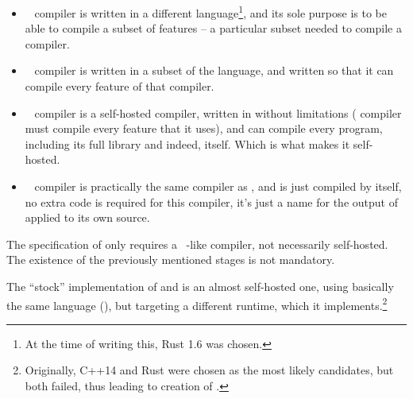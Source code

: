 \begin{itemize}
  \item {}~ \AmlSystem compiler is written in a different language\footnote{At the time of writing this, Rust 1.6 was chosen.}, and its sole purpose is to be able to compile a subset of \AmlSystem features -- a particular subset needed to compile a  compiler. 
  \item {}~ \AmlSystem compiler is written in a subset of the \AmlSystem language, and written so that it can compile every feature of \AmlSystem that  compiler. 
  \item {}~ \AmlSystem compiler is a self-hosted compiler, written in \AmlSystem without limitations ( compiler must compile every feature that it uses), and can compile every \AmlSystem program, including its full library and indeed, itself. Which is what makes it self-hosted. 
  \item {}~ \AmlSystem compiler is practically the same compiler as , and is just compiled by itself, no extra code is required for this compiler, it's just a name for the output of  applied to its own source. 
\end{itemize}

The specification of \AmlSystem only requires a ~-like compiler, not necessarily self-hosted. The existence of the previously mentioned stages is not mandatory. 

The ``stock'' implementation of \Aml and \AmlSE is an almost self-hosted one, using basically the same language (\AmlSystem), but targeting a different runtime, which it implements.\footnote{Originally, C++14 and Rust were chosen as the most likely candidates, but both failed, thus leading to creation of \AmlSystem.}







